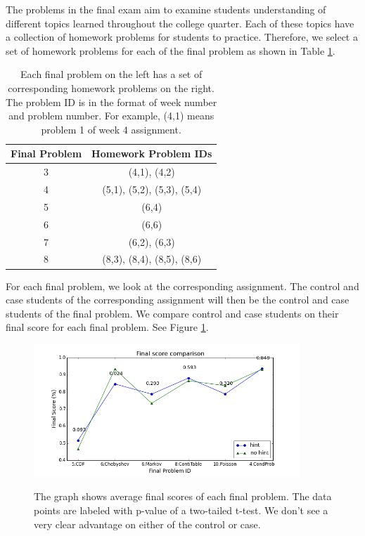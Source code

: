 \documentclass{llncs}
\begin{document}
The problems in the final exam aim to examine students understanding of different topics learned throughout the college quarter. Each of these topics have a collection of homework problems for students to practice. Therefore, we select a set of homework problems for each of the final problem as shown in Table \ref{tab:map}.

\begin{table}[h]
\caption{Each final problem on the left has a set of corresponding homework problems on the right. The problem ID is in the format of week number and problem number. For example, (4,1) means problem 1 of week 4 assignment.}
\begin{center}
  \begin{tabular}{ c | c }
   Final Problem & Homework Problem IDs \\ \hline
	3 & (4,1), (4,2) \\
	4 & (5,1), (5,2), (5,3), (5,4) \\
    5 & (6,4) \\
    6 & (6,6) \\
    7 & (6,2), (6,3) \\
    8 & (8,3), (8,4), (8,5), (8,6) \\ \hline
  \end{tabular}
  \label{tab:map}
  \end{center}
\end{table}

For each final problem, we look at the corresponding assignment. The control and case students of the corresponding assignment will then be the control and case students of the final problem. We compare control and case students on their final score for each final problem. See Figure \ref{fig:final_compare_all}.

\begin{figure}[h]
\centering
\caption{The graph shows average final scores of each final problem. The data points are labeled with p-value of a two-tailed t-test. We don't see a very clear advantage on either of the control or case.}
\includegraphics[width=0.8\linewidth, height=5cm]{image/final_compare.png}
\label{fig:final_compare_all}
\end{figure}
\end{document}
